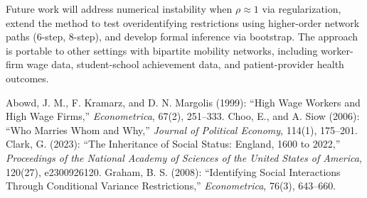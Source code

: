 \documentclass[11pt]{article}
\begin{document}
Future work will address numerical instability when $\rho \approx 1$ via regularization, extend the method to test overidentifying restrictions using higher-order network paths (6-step, 8-step), and develop formal inference via bootstrap. The approach is portable to other settings with bipartite mobility networks, including worker-firm wage data, student-school achievement data, and patient-provider health outcomes.


\begin{thebibliography}{9}
 Abowd, J. M., F. Kramarz, and D. N. Margolis (1999): ``High Wage Workers and High Wage Firms,'' \emph{Econometrica}, 67(2), 251--333.
 Choo, E., and A. Siow (2006): ``Who Marries Whom and Why,'' \emph{Journal of Political Economy}, 114(1), 175--201.
 Clark, G. (2023): ``The Inheritance of Social Status: England, 1600 to 2022,'' \emph{Proceedings of the National Academy of Sciences of the United States of America}, 120(27), e2300926120.
 Graham, B. S. (2008): ``Identifying Social Interactions Through Conditional Variance Restrictions,'' \emph{Econometrica}, 76(3), 643--660.
\end{thebibliography}
\end{document}
